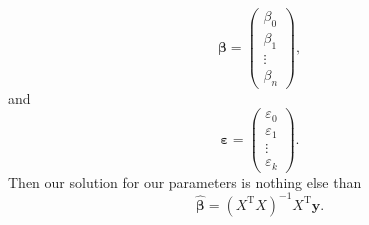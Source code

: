 \documentclass[10pt,a4paper, onecolumn, conference]{IEEEtran}
\theoremstyle{own}
\theoremstyle{definition}
\theoremstyle{plain}
\begin{document}
\begin{equation}
\boldsymbol\beta = \left( \begin{matrix} \beta_0 \\ \beta_1 \\ \vdots \\ \beta_n \end{matrix} \right),
\end{equation}
and
\begin{equation}
\boldsymbol\varepsilon = \left( \begin{matrix} \varepsilon_0 \\ \varepsilon_1 \\ \vdots \\ \varepsilon_k \end{matrix} \right).
\end{equation}
Then our solution for our parameters is nothing else than
\begin{equation}
\hat{\boldsymbol\beta} = (X^{\text{T}} X)^{-1} X^{\text{T}}\mathbf{y}.
\end{equation}
\end{document}
